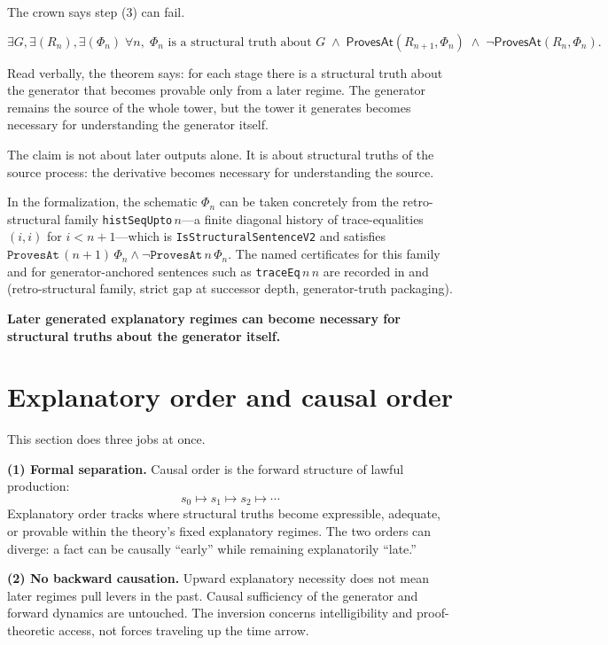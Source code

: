 \documentclass[11pt,a4paper]{article}
\newenvironment{keybox}[1]{%
  \Needspace*{8\baselineskip}%
  \begin{tcolorbox}[
    enhanced, breakable=false,
    colback=blue!5, colframe=blue!45!black, coltitle=black,
    colbacktitle=blue!14, boxrule=0.85pt, arc=2.5pt,
    left=9pt, right=9pt, top=6pt, bottom=6pt,
    titlerule=0.55pt, fonttitle=\bfseries, title={#1},
    before upper=\raggedright,
    before skip=0.9\baselineskip, after skip=0.9\baselineskip
  ]%
}{%
  \end{tcolorbox}%
}
\theoremstyle{definition}
\newcommand{\ProvesAt}{\mathsf{ProvesAt}}
\begin{document}
The crown says step (3) can fail.

\[
\exists G,\exists(R_n),\exists(\Phi_n)\;
\forall n,\;
\Phi_n \text{ is a structural truth about } G
\;\wedge\;
\ProvesAt(R_{n+1},\Phi_n)
\;\wedge\;
\neg \ProvesAt(R_n,\Phi_n).
\]

Read verbally, the theorem says: for each stage there is a structural truth about the generator that becomes provable only from a later regime. The generator remains the source of the whole tower, but the tower it generates becomes necessary for understanding the generator itself.

The claim is not about later outputs alone. It is about structural truths of the source process: the derivative becomes necessary for understanding the source.

In the formalization, the schematic $\Phi_n$ can be taken concretely from the retro-structural family \texttt{histSeqUpto}\,$n$---a finite diagonal history of trace-equalities $(i,i)$ for $i<n+1$---which is \texttt{IsStructuralSentenceV2} and satisfies $\texttt{ProvesAt}\,(n{+}1)\,\Phi_n \land \neg\texttt{ProvesAt}\,n\,\Phi_n$. The named certificates for this family and for generator-anchored sentences such as \texttt{traceEq}\,$n\,n$ are recorded in  and  (retro-structural family, strict gap at successor depth, generator-truth packaging).

\begin{keybox}{The crown inversion}
\textbf{Later generated explanatory regimes can become necessary for structural truths about the generator itself.}
\end{keybox}

\section{Explanatory order and causal order}\label{sec:order-divergence}

This section does three jobs at once.

\medskip
\noindent
\textbf{(1) Formal separation.}
Causal order is the forward structure of lawful production:
\[
s_0 \mapsto s_1 \mapsto s_2 \mapsto \cdots
\]
Explanatory order tracks where structural truths become expressible, adequate, or provable within the theory's fixed explanatory regimes. The two orders can diverge: a fact can be causally ``early'' while remaining explanatorily ``late.''

\medskip
\noindent
\textbf{(2) No backward causation.}
Upward explanatory necessity does not mean later regimes pull levers in the past. Causal sufficiency of the generator and forward dynamics are untouched. The inversion concerns intelligibility and proof-theoretic access, not forces traveling up the time arrow.
\end{document}
